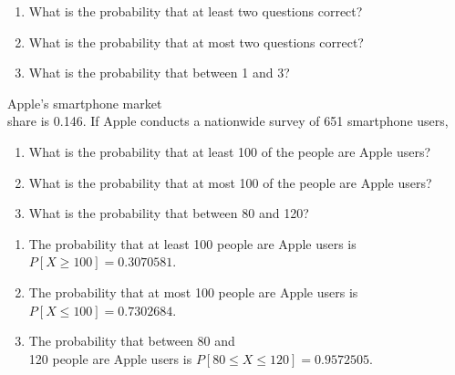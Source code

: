 \documentclass[11pt, chapterprefix=true]{scrbook}\usepackage[]{graphicx}\usepackage[]{color}
\begin{document}
\begin{exercises}
\begin{exercise}
\begin{enumerate}
\item What is the probability that at least two questions correct?
\item What is the probability that at most two questions correct?
\item What is the probability that between 1 and 3?
\end{enumerate}
	\end{exercise}
%
%

  \begin{exercise} %

Apple's smartphone market \\ share is  0.146. If Apple conducts a nationwide survey of 651 smartphone users,

\begin{enumerate}
\item What is the probability that at least 100 of the people are Apple users?
\item What is the probability that at most 100 of the people are Apple users?
\item What is the probability that between 80 and 120?
\end{enumerate}
	\end{exercise}
	\begin{solution}  %


\begin{enumerate}
\item The probability that at least 100 people are Apple users is $P[X \ge 100] = 0.3070581$.
\item The probability that at most 100 people are Apple users is $P[X \le 100] = 0.7302684$.
\item The probability that between 80 and \\ 120 people are Apple users is $P[ 80 \le X \le 120] = 0.9572505$.
\end{enumerate}
	\end{solution}


\end{exercises}
\end{document}
